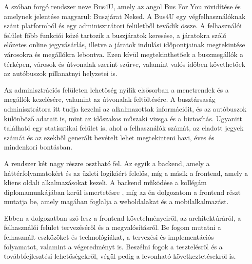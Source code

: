 A szóban forgó rendszer neve Bus4U, amely az angol Bus For You rövidítése és amelynek jelentése magyarul: Buszjárat Neked. A Bus4U egy végfelhasználóknak szánt platformból és egy adminisztrátori felületből tevődik össze. A felhasználói felület főbb funkciói közé tartozik a buszjáratok keresése, a járatokra szóló előzetes online jegyvásárlás, illetve a járatok indulási időpontjainak megtekintése városokra és megállókra lebontva. Ezen kívül megtekinthetőek a buszmegállók a térképen, városok és útvonalak szerint szűrve, valamint valós időben követhetőek az autóbuszok pillanatnyi helyzetei is.

Az adminisztrációs felületen lehetőség nyílik elsősorban a menetrendek és a megállók kezelésére, valamint az útvonalak feltöltésére. A busztársaság adminisztrátora itt tudja kezelni az alkalmazottak információit, és az autóbuszok különböző adatait is, mint az időszakos műszaki vizsga és a biztosítás. Ugyanitt található egy statisztikai felület is, ahol a felhasználók számát, az eladott jegyek számát és az ezekből generált bevételt lehet megtekinteni havi, éves és mindenkori bontásban.

A rendszer két nagy részre osztható fel. Az egyik a backend, amely a háttérfolyamatokért és az üzleti logikáért felelős, míg a másik a frontend, amely a kliens oldali alkalmazásokat kezeli. A backend működése a kollégám diplomamunkájában kerül ismertetésre \cite{bus4userver}, míg az én dolgozatom a frontend részt mutatja be, amely magában foglalja a weboldalakat és a mobilalkalmazást.

Ebben a dolgozatban szó lesz a frontend követelményeiről, az architektúráról, a felhasználói felület tervezéséről és a megvalósításról. Be fogom mutatni a felhasznált eszközöket és technológiákat, a tervezési és implementációs folyamatot, valamint a végeredményt is. Beszélni fogok a tesztelésről és a továbbfejlesztési lehetőségekről, végül pedig a levonható következtetésekről is.